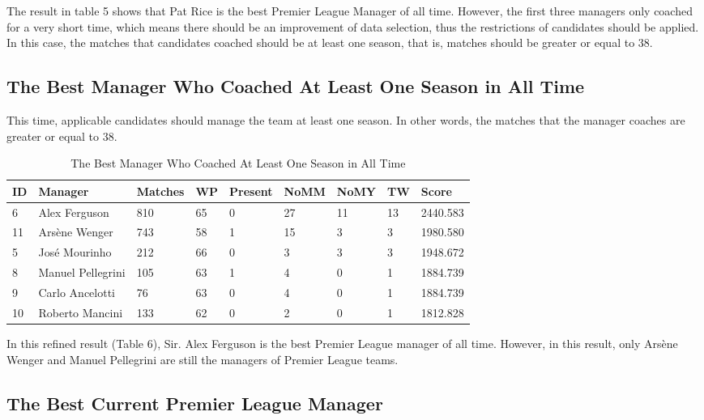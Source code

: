 \documentclass[12pt,a4paper]{article}
\begin{document}
   The result in table 5 shows that Pat Rice is the best Premier League Manager of all time. However, the first three managers only coached for a very short time, which means there should be an improvement of data selection, thus the restrictions of candidates should be applied. In this case, the matches that candidates coached should be at least one season, that is, matches should be greater or equal to 38.
   
\subsection{The Best Manager Who Coached At Least One Season in All Time}

    This time, applicable candidates should manage the team at least one season. In other words, the matches that the manager coaches are greater or equal to 38.
   

\begin{table}[h]
    \centering
    \caption{The Best Manager Who Coached At Least One Season in All Time}
    \begin{tabular}{lllllllll}
    \hline
    ID & Manager & Matches & WP & Present & NoMM & NoMY & TW & Score  \\
    \hline\hline
    6 & Alex Ferguson & 810 & 65  & 0 & 27 & 11 & 13 & 2440.583 \\
    11 & Arsène Wenger & 743 & 58 & 1 & 15 & 3 & 3 & 1980.580  \\
    5 & José Mourinho & 212 & 66 & 0 & 3 & 3 & 3 & 1948.672  \\
    8 & Manuel Pellegrini & 105 & 63 & 1 & 4 & 0 & 1 & 1884.739  \\
    9 & Carlo Ancelotti & 76 & 63 &  0 & 4 & 0 & 1 & 1884.739  \\
    10 & Roberto Mancini & 133 & 62 & 0 & 2 & 0 & 1 & 1812.828  \\
     \hline\hline
    \end{tabular}
\end{table}


    In this refined result (Table 6), Sir. Alex Ferguson is the best Premier League manager of all time. However, in this result, only Arsène Wenger and Manuel Pellegrini are still the managers of Premier League teams. 
    
    
\subsection{The Best Current Premier League Manager}
 
\end{document}

